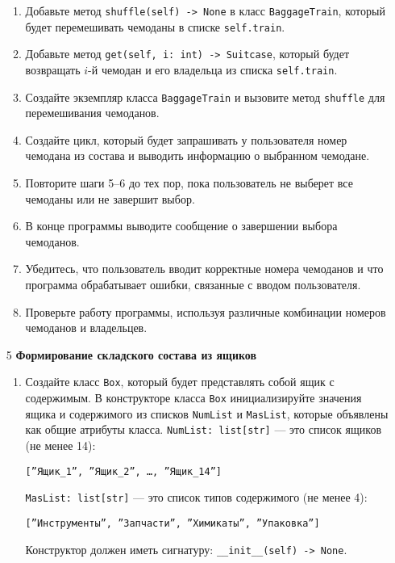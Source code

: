 \begin{enumerate}
\begin{enumerate}
    \item Добавьте метод \texttt{shuffle(self) -> None} в класс \texttt{BaggageTrain}, который будет перемешивать чемоданы в списке \texttt{self.train}.

    \item Добавьте метод \texttt{get(self, i: int) -> Suitcase}, который будет возвращать $i$-й чемодан и его владельца из списка \texttt{self.train}.

    \item Создайте экземпляр класса \texttt{BaggageTrain} и вызовите метод \texttt{shuffle} для перемешивания чемоданов.

    \item Создайте цикл, который будет запрашивать у пользователя номер чемодана из состава и выводить информацию о выбранном чемодане.

    \item Повторите шаги 5–6 до тех пор, пока пользователь не выберет все чемоданы или не завершит выбор.

    \item В конце программы выводите сообщение о завершении выбора чемоданов.

    \item Убедитесь, что пользователь вводит корректные номера чемоданов и что программа обрабатывает ошибки, связанные с вводом пользователя.

    \item Проверьте работу программы, используя различные комбинации номеров чемоданов и владельцев.
\end{enumerate}

\item[5] \textbf{Формирование складского состава из ящиков}
\begin{enumerate}
    \item Создайте класс \texttt{Box}, который будет представлять собой ящик с содержимым. В конструкторе класса \texttt{Box} инициализируйте значения ящика и содержимого из списков \texttt{NumList} и \texttt{MasList}, которые объявлены как общие атрибуты класса. \texttt{NumList: list[str]} — это список ящиков (не менее 14): 
    \begin{center}
        \texttt{[''Ящик\_1'', ''Ящик\_2'', \dots, ''Ящик\_14'']}
    \end{center}
    \texttt{MasList: list[str]} — это список типов содержимого (не менее 4):
    \begin{center}
        \texttt{[''Инструменты'', ''Запчасти'', ''Химикаты'', ''Упаковка'']}
    \end{center}
    Конструктор должен иметь сигнатуру: \texttt{\_\_init\_\_(self) -> None}.


\end{enumerate}
\end{enumerate}
